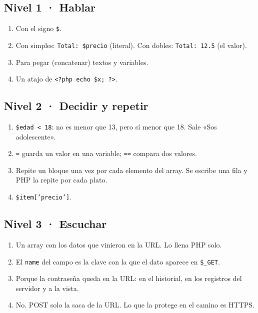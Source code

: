 \subsection*{Nivel 1 · Hablar}
\begin{enumerate}
  \item Con el signo \texttt{\$}.
  \item Con simples: \texttt{Total: \$precio} (literal). Con dobles: \texttt{Total: 12.5} (el valor).
  \item Para pegar (concatenar) textos y variables.
  \item Un atajo de \texttt{<?php echo \$x; ?>}.
\end{enumerate}

\subsection*{Nivel 2 · Decidir y repetir}
\begin{enumerate}
  \item \texttt{\$edad < 18}: no es menor que 13, pero sí menor que 18. Sale «Sos adolescente».
  \item \texttt{=} guarda un valor en una variable; \texttt{==} compara dos valores.
  \item Repite un bloque una vez por cada elemento del array. Se escribe una fila y PHP la repite por cada plato.
  \item \texttt{\$item['precio']}.
\end{enumerate}

\subsection*{Nivel 3 · Escuchar}
\begin{enumerate}
  \item Un array con los datos que vinieron en la URL. Lo llena PHP solo.
  \item El \texttt{name} del campo es la clave con la que el dato aparece en \texttt{\$\_GET}.
  \item Porque la contraseña queda en la URL: en el historial, en los registros del servidor y a la vista.
  \item No. POST solo la saca de la URL. Lo que la protege en el camino es HTTPS.
\end{enumerate}

